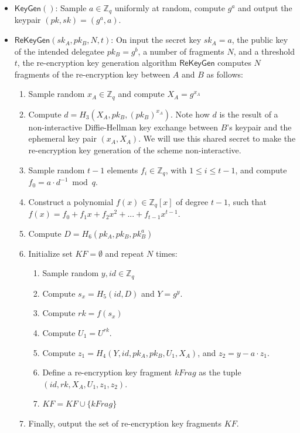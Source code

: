 \documentclass{amsart}
\begin{document}
\begin{itemize}
	\item $\mathsf{KeyGen}()$: Sample $a \in \mathbb Z_q$ uniformly at random, compute $g^a$ and output the keypair $(pk, sk) = (g^a, a)$.

	\item $\mathsf{ReKeyGen}(sk_A, pk_B, N, t)$: On input the secret key $sk_{A} = a$, the public key of the intended delegatee $pk_{B} = g^b$, a number of fragments $N$, and a threshold $t$, the re-encryption key generation algorithm $\mathsf{ReKeyGen}$ computes $N$ fragments of the re-encryption key between $A$ and $B$ as follows:
	
	\begin{enumerate}
\item Sample random $x_A \in \mathbb Z_q$ and compute $X_A = g^{x_A}$
\item Compute $ d = H_3(X_A, pk_B, (pk_B)^{x_A})$. Note how $d$ is the result of a non-interactive Diffie-Hellman key exchange between $B$'s keypair and the ephemeral key pair $(x_A, X_A)$. We will use this shared secret to make the re-encryption key generation of the scheme non-interactive.
\item Sample random $t-1$ elements $f_i\in \mathbb Z_q$, with $1 \leq i \leq t-1$, and  compute $f_0 = a \cdot d^{-1} \bmod q$.
\item Construct a polynomial $f(x) \in \mathbb Z_q[x]$ of degree $t-1$, such that $f(x) = f_0 + f_1x + f_2x^2 + ... + f_{t-1}x^{t-1}$.  
\item Compute $ D = H_6(pk_A, pk_B, pk_B^a)$
\item Initialize set $KF = \emptyset$ and repeat $N$ times:

    \begin{enumerate}
    \item Sample random $y, id \in \mathbb Z_q$
    \item Compute $s_x = H_5(id, D)$ and $Y = g^y$.
    \item Compute $rk = f(s_x)$ 
    \item Compute $U_1 = U^{rk}$.
    \item Compute $z_1 = H_4(Y, id, pk_A, pk_B, U_1, X_A)$, and $z_2 = y - a \cdot z_1$.
    \item Define a re-encryption key fragment $kFrag$ as the tuple $(id, rk, X_A, U_1, z_1, z_2)$.
    \item $KF = KF \cup \{kFrag\}$
	\end{enumerate}

\item Finally, output the set of re-encryption key fragments $KF$.
\end{enumerate}
\end{itemize}
\end{document}
